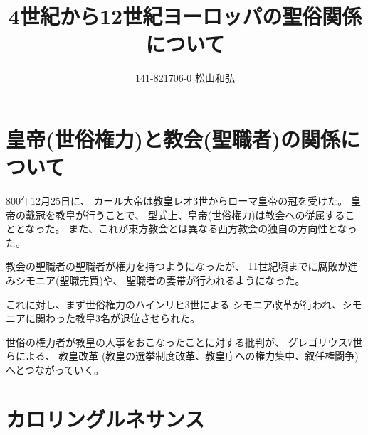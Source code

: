 \documentclass{jsarticle}
\begin{document}
\title{4世紀から12世紀ヨーロッパの聖俗関係について}
\author{141-821706-0 松山和弘}
\maketitle

\section{皇帝(世俗権力)と教会(聖職者)の関係について}

800年12月25日に、
カール大帝は教皇レオ3世からローマ皇帝の冠を受けた。
皇帝の戴冠を教皇が行うことで、
型式上、皇帝(世俗権力)は教会への従属することとなった。
また、これが東方教会とは異なる西方教会の独自の方向性となった。

教会の聖職者の聖職者が権力を持つようになったが、
11世紀頃までに腐敗が進みシモニア(聖職売買)や、
聖職者の妻帯が行われるようになった。

これに対し、まず世俗権力のハインリヒ3世による
シモニア改革が行われ、シモニアに関わった教皇3名が退位させられた。

世俗の権力者が教皇の人事をおこなったことに対する批判が、
グレゴリウス7世らによる、
教皇改革 (教皇の選挙制度改革、教皇庁への権力集中、叙任権闘争) 
へとつながっていく。


\section{カロリングルネサンス}
\end{document}
